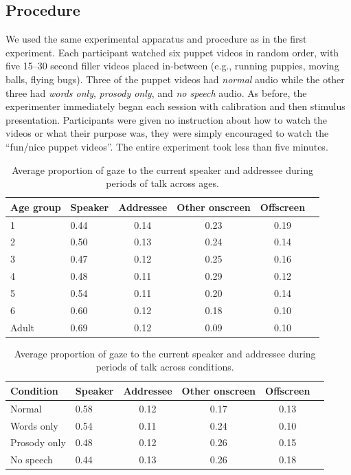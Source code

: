 \documentclass[authoryear, 12pt]{elsarticle}
\begin{document}
\subsection*{Procedure}
We used the same experimental apparatus and procedure as in the first experiment. Each participant watched six puppet videos in random order, with five 15--30 second filler videos placed in-between (e.g., running puppies, moving balls, flying bugs). Three of the puppet videos had \textit{normal} audio while the other three had \textit{words only}, \textit{prosody only}, and \textit{no speech} audio. As before, the experimenter immediately began each session with calibration and then stimulus presentation. Participants were given no instruction about how to watch the videos or what their purpose was, they were simply encouraged to watch the ``fun/nice puppet videos''. The entire experiment took less than five minutes.

\linespread{1}
\begin{table}[t]
\begin{center}
  \begin{tabular}{llcccc}
    \hline
    Age group & Speaker & Addressee & Other onscreen & Offscreen\\ 
    \hline
    1 & 0.44 & 0.14 & 0.23 & 0.19 \\ 
    2 & 0.50 & 0.13 & 0.24 & 0.14 \\ 
    3 & 0.47 & 0.12 & 0.25 & 0.16 \\ 
    4 & 0.48 & 0.11 & 0.29 & 0.12 \\ 
    5 & 0.54 & 0.11 & 0.20 & 0.14 \\ 
    6 & 0.60 & 0.12 & 0.18 & 0.10 \\
    Adult & 0.69 & 0.12 & 0.09 & 0.10 \\
    \hline
  \end{tabular}
\end{center}
  \caption{Average proportion of gaze to the current speaker and addressee during periods of talk across ages.}
\label{tab:look_e2}
\end{table}

\linespread{1}
\begin{table}
\begin{center}
  \begin{tabular}{llcccc}
    \hline
    Condition & Speaker & Addressee & Other onscreen & Offscreen\\ 
    \hline
    Normal 			& 0.58 & 0.12 & 0.17 & 0.13 \\ 
    Words only 		& 0.54 & 0.11 & 0.24 & 0.10 \\ 
    Prosody only 	& 0.48 & 0.12 & 0.26 & 0.15 \\ 
    No speech 		& 0.44 & 0.13 & 0.26 & 0.18 \\
    \hline
  \end{tabular}
\end{center}
  \caption{Average proportion of gaze to the current speaker and addressee during periods of talk across conditions.}
\label{tab:look_e2b}
\end{table}
\end{document}
